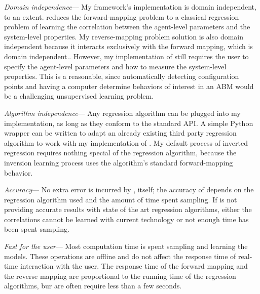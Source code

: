 \textit{Domain independence}---
My framework's implementation is domain independent, to an extent. \fw reduces the forward-mapping problem to a classical regression problem of learning the correlation between the agent-level parameters and the system-level properties.
My reverse-mapping problem solution is also domain independent because it interacts exclusively with the forward mapping, which is domain independent..
However, my implementation of \fw still requires the user to specify the agent-level parameters and how to measure the system-level properties.
This is a reasonable, since automatically detecting configuration points and having a computer determine behaviors of interest in an ABM would be a challenging unsupervised learning problem.

\textit{Algorithm independence}---
Any regression algorithm can be plugged into my implementation, as long as they conform to the standard API.
A simple Python wrapper can be written to adapt an already existing third party regression algorithm to work with my implementation of \fw.
My  default process of inverted regression requires nothing special of the regression algorithm, because the inversion learning process uses the algorithm's standard forward-mapping behavior.

\textit{Accuracy}---
No extra error is incurred by \fw, itself;
the accuracy of \fw depends on the regression algorithm used and the amount of time spent sampling.
If \fw is not providing accurate results with state of the art regression algorithms, either the correlations cannot be learned with current technology or not enough time has been spent sampling.


\textit{Fast for the user}---
Most computation time is spent sampling and learning the models.
These operations are offline and do not affect the response time of real-time interaction with the user.
The response time of the forward mapping and the reverse mapping are proportional to the running time of the regression algorithms, bur are often require less than a few seconds.





